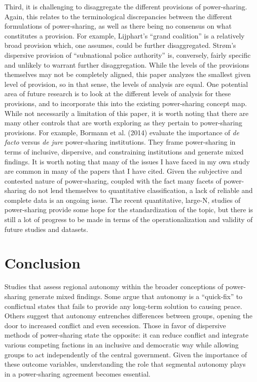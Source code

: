 \documentclass[12pt]{article}
\begin{document}
Third, it is challenging to disaggregate the different provisions of power-sharing. Again, this relates to the terminological discrepancies between the different formulations of power-sharing, as well as there being no consensus on what constitutes a provision. For example, Lijphart’s ``grand coalition'' is a relatively broad provision which, one assumes, could be further disaggregated. Strøm’s dispersive provision of ``subnational police authority'' is, conversely, fairly specific and unlikely to warrant further disaggregation. While the levels of the provisions themselves may not be completely aligned, this paper analyzes the smallest given level of provision, so in that sense, the levels of analysis are equal. One potential area of future research is to look at the different levels of analysis for these provisions, and to incorporate this into the existing power-sharing concept map. While not necessarily a limitation of this paper, it is worth noting that there are many other controls that are worth exploring as they pertain to power-sharing provisions. For example, Bormann et al. (2014) evaluate the importance of \textit{de facto} versus \textit{de jure} power-sharing institutions. They frame power-sharing in terms of inclusive, dispersive, and constraining institutions and generate mixed findings. It is worth noting that many of the issues I have faced in my own study are common in many of the papers that I have cited. Given the subjective and contested nature of power-sharing, coupled with the fact many facets of power-sharing do not lend themselves to quantitative classification, a lack of reliable and complete data is an ongoing issue. The recent quantitative, large-N, studies of power-sharing provide some hope for the standardization of the topic, but there is still a lot of progress to be made in terms of the operationalization and validity of future studies and datasets.  

\section{Conclusion}
Studies that assess regional autonomy within the broader conceptions of power-sharing generate mixed findings. Some argue that autonomy is a ``quick-fix'' to conflictual states that fails to provide any long-term solution to causing peace. Others suggest that autonomy entrenches differences between groups, opening the door to increased conflict and even secession. Those in favor of dispersive methods of power-sharing state the opposite: it can reduce conflict and integrate various competing factions in an inclusive and democratic way while allowing groups to act independently of the central government. Given the importance of these outcome variables, understanding the role that segmental autonomy plays in a power-sharing agreement becomes essential. 
\end{document}
